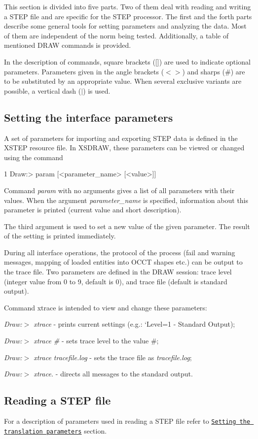 This section is divided into five parts. Two of them deal with reading and writing a S\+T\+EP file and are specific for the S\+T\+EP processor. The first and the forth parts describe some general tools for setting parameters and analyzing the data. Most of them are independent of the norm being tested. Additionally, a table of mentioned D\+R\+AW commands is provided.

In the description of commands, square brackets (\mbox{[}\mbox{]}) are used to indicate optional parameters. Parameters given in the angle brackets ($<$$>$) and sharps (\#) are to be substituted by an appropriate value. When several exclusive variants are possible, a vertical dash ($\vert$) is used.\hypertarget{occt_user_guides__step_occt_step_6_2}{}\subsection{Setting the interface parameters}\label{occt_user_guides__step_occt_step_6_2}
A set of parameters for importing and exporting S\+T\+EP data is defined in the X\+S\+T\+EP resource file. In X\+S\+D\+R\+AW, these parameters can be viewed or changed using the command 
\begin{DoxyCode}
1 Draw:> param [<parameter\_name> [<value>]] 
\end{DoxyCode}
 Command {\itshape param} with no arguments gives a list of all parameters with their values. When the argument {\itshape parameter\+\_\+name} is specified, information about this parameter is printed (current value and short description).

The third argument is used to set a new value of the given parameter. The result of the setting is printed immediately.

During all interface operations, the protocol of the process (fail and warning messages, mapping of loaded entities into O\+C\+CT shapes etc.) can be output to the trace file. Two parameters are defined in the D\+R\+AW session\+: trace level (integer value from 0 to 9, default is 0), and trace file (default is standard output).

Command xtrace is intended to view and change these parameters\+:
\begin{DoxyItemize}
\item {\itshape Draw\+:$>$ xtrace} -\/ prints current settings (e.\+g.\+: `\+Level=1 -\/ Standard Output\textquotesingle{});
\item {\itshape Draw\+:$>$ xtrace \#} -\/ sets trace level to the value \#;
\item {\itshape Draw\+:$>$ xtrace tracefile.\+log} -\/ sets the trace file as {\itshape tracefile.\+log};
\item {\itshape Draw\+:$>$ xtrace.} -\/ directs all messages to the standard output.
\end{DoxyItemize}\hypertarget{occt_user_guides__step_occt_step_6_3}{}\subsection{Reading a S\+T\+E\+P file}\label{occt_user_guides__step_occt_step_6_3}
For a description of parameters used in reading a S\+T\+EP file refer to \href{#occt_step_2_3_3}{\tt Setting the translation parameters} section.

